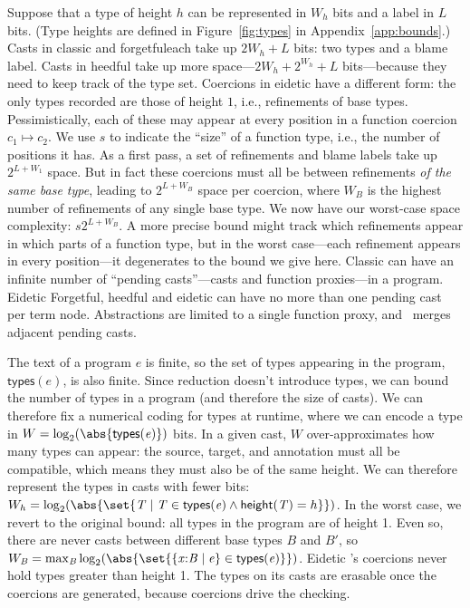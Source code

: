 \documentclass[9pt]{extarticle}
\newcommand{\ottnt}[1]{\mathit{#1}}
\begin{document}
Suppose that a type of height $h$ can be represented in $W_h$ bits and
a label in $L$ bits. (Type heights are defined in
Figure~\ref{fig:types} in Appendix~\ref{app:bounds}.) Casts in classic
\iffull and forgetful\fi \lambdah each take up $2W_h + L$ bits: two
types and a blame label.
{\iffull
Casts in heedful \lambdah take up more space---$2W_h + 2^{W_h} + L$
bits---because they need to keep track of the type set. \fi}
Coercions in eidetic \lambdah have a different form: the only types
recorded are those of height $1$, i.e., refinements of base
types. Pessimistically, each of these may appear at every position in
a function coercion $\ottnt{c_{{\mathrm{1}}}}  \mapsto  \ottnt{c_{{\mathrm{2}}}}$. We use $s$ to indicate the ``size''
of a function type, i.e., the number of positions it has. As a first
pass, a set of refinements and blame labels take up $2^{L + W_1}$
space. But in fact these coercions must all be between refinements
\textit{of the same base type}, leading to $2^{L + W_{\ottnt{B}}}$ space
per coercion, where $W_{\ottnt{B}}$ is the highest number of refinements
of any single base type.
We now have our worst-case space complexity: $s 2^{L + W_{\ottnt{B}}}$.
A more precise bound might track which refinements appear in which
parts of a function type, but in the worst case---each
refinement appears in every position---it degenerates to
the bound we give here.
Classic \lambdah can have an infinite number of ``pending
casts''---casts and function proxies---in a program. \ifpopl Eidetic
\else Forgetful, heedful and eidetic \fi \lambdah can have no more
than one pending cast per term node. Abstractions are limited to a
single function proxy, and \ECastMerge\ merges adjacent pending casts.

The text of a program $\ottnt{e}$ is finite, so the set of types appearing
in the program, $ \mathsf{types} ( \ottnt{e} ) $, is also finite. Since reduction
doesn't introduce types, we can bound the number of types in a program
(and therefore the size of casts).
We can therefore fix a numerical coding for types at runtime, where we
can encode a type in $W = \log_2(\abs{ \mathsf{types} ( \ottnt{e} ) })$ bits.
In a given cast, $W$ over-approximates how many types can appear: the
source, target, and annotation must all be compatible, which means
they must also be of the same height.
We can therefore represent the types in casts with fewer bits: $W_h =
\log_2(\abs{\set{\ottnt{T} \mid  \ottnt{T}  \in   \mathsf{types} ( \ottnt{e} )   \wedge  \mathsf{height} ( \ottnt{T} )  =
    h}})$.
In the worst case, we revert to the original bound: all types in the
program are of height 1. Even so, there are never casts between
different base types $\ottnt{B}$ and $\ottnt{B'}$, so $W_{\ottnt{B}} = \max_{\ottnt{B}}
\log_2(\abs{\set{  \{ \mathit{x} \mathord{:} \ottnt{B} \mathrel{\mid} \ottnt{e} \}   \in   \mathsf{types} ( \ottnt{e} )  }})$.
Eidetic \lambdah's coercions never hold types greater than height 1.
The types on its casts are erasable once the coercions are
generated, because coercions drive the checking.
\end{document}
